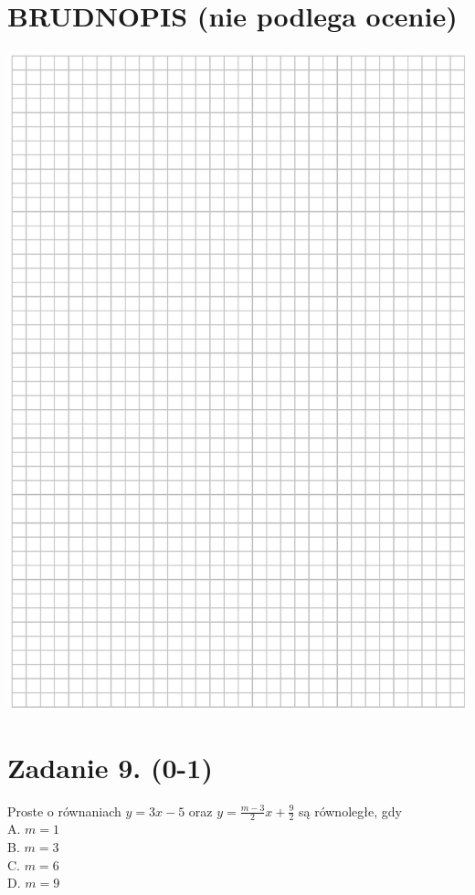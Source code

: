 \documentclass[10pt]{article}
\begin{document}
\section*{BRUDNOPIS (nie podlega ocenie)}
\begin{center}
\includegraphics[max width=\textwidth]{2024_11_21_46d945490f1b2eff1c8eg-05}
\end{center}

\section*{Zadanie 9. (0-1)}
Proste o równaniach \(y=3 x-5\) oraz \(y=\frac{m-3}{2} x+\frac{9}{2}\) są równoległe, gdy\\
A. \(m=1\)\\
B. \(m=3\)\\
C. \(m=6\)\\
D. \(m=9\)
\end{document}
